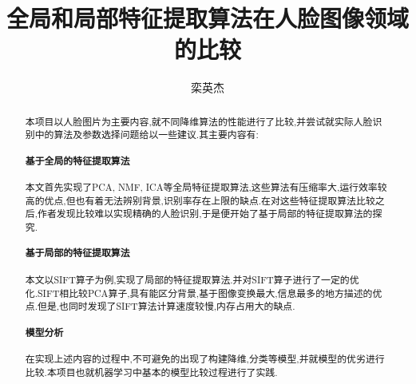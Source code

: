   \confidential{}%
  \title[兰州大学本科毕业设计实践~\LaTeX{}~模板]{全局和局部特征提取算法在人脸图像领域的比较}
  \author{栾英杰}%

\maketitle
\makeenglishtitle



\begin{abstract}

本项目以人脸图片为主要内容,就不同降维算法的性能进行了比较,并尝试就实际人脸识别中的算法及参数选择问题给以一些建议.其主要内容有:

\paragraph{基于全局的特征提取算法} 本文首先实现了PCA, NMF, ICA等全局特征提取算法,这些算法有压缩率大,运行效率较高的优点,但也有着无法辨别背景,识别率存在上限的缺点.在对这些特征提取算法比较之后,作者发现比较难以实现精确的人脸识别,于是便开始了基于局部的特征提取算法的探究.
\paragraph{基于局部的特征提取算法} 本文以SIFT算子为例,实现了局部的特征提取算法.并对SIFT算子进行了一定的优化.SIFT相比较PCA算子,具有能区分背景,基于图像变换最大,信息最多的地方描述的优点.但是,也同时发现了SIFT算法计算速度较慢,内存占用大的缺点.
\paragraph{模型分析} 在实现上述内容的过程中,不可避免的出现了构建降维,分类等模型,并就模型的优劣进行比较.本项目也就机器学习中基本的模型比较过程进行了实践.



\end{abstract}


